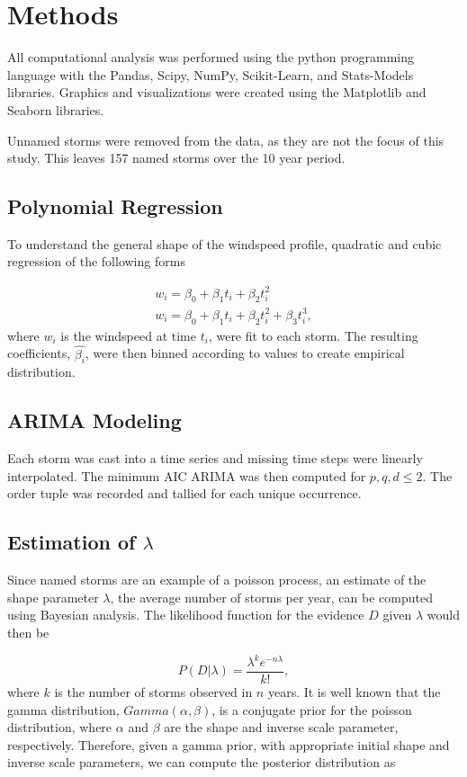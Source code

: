 \documentclass{article}
\begin{document}
	\section{Methods}
	 All computational analysis was performed using the python programming language with the Pandas, Scipy, NumPy, Scikit-Learn, and Stats-Models libraries\cite{mckinney2010data, scipy, walt2011numpy, scikit-learn, statsmodels2010}. Graphics and visualizations were created using the Matplotlib and Seaborn libraries\cite{hunter2007matplotlib, michael_waskom_2014_12710}.
	 
	 Unnamed storms were removed from the data, as they are not the focus of this study. This leaves 157 named storms over the 10 year period. 

	\subsection{Polynomial Regression}
	To understand the general shape of the windspeed profile, quadratic and cubic regression of the following forms
	
		\begin{align}
			w_i = \beta_0 + \beta_1 t_i + \beta_2 t_i^2\\
			w_i = \beta_0 + \beta_1 t_i + \beta_2 t_i^2 + \beta_3 t_i^3,
		\end{align}
	where $w_i$ is the windspeed at time $t_i$, were fit to each storm. The resulting coefficients, $\hat{\beta_i}$, were then binned 
according to values to create empirical distribution.

	\subsection{ARIMA Modeling}
	Each storm was cast into a time series and missing time steps were linearly interpolated. The minimum AIC ARIMA was then computed for $p, q, d \le 2$. The order tuple was recorded and tallied for each unique occurrence.

	\subsection{Estimation of $\lambda$}
	Since named storms are an example of a poisson process, an estimate of the shape parameter $\lambda$, the average number of storms per year, can be computed using Bayesian analysis. The likelihood function for the evidence $D$ given $\lambda$ would then be
	
		\begin{equation}
			P(D | \lambda) = \frac{\lambda^k e^{-n \lambda}}{k!},
		\end{equation}
		where $k$ is the number of storms observed in $n$ years. It is well known that the gamma distribution, $Gamma(\alpha, \beta)$, is a conjugate prior for the poisson distribution, where $\alpha$ and $\beta$ are the shape and inverse scale parameter, respectively. Therefore, given a gamma prior, with appropriate initial shape and inverse scale parameters, we can compute the posterior distribution as
		
\end{document}
